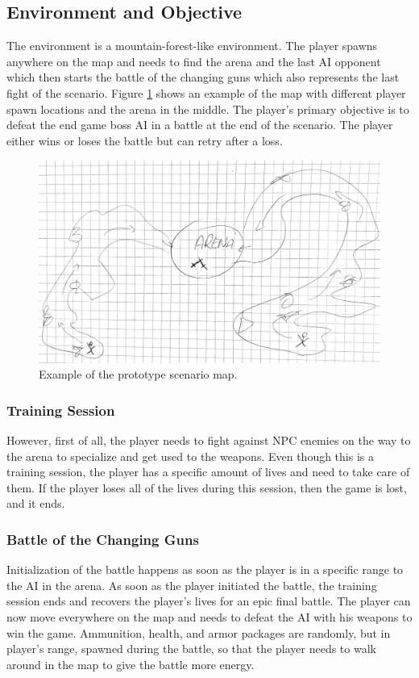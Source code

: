 \documentclass[MGS,Master,english]{twbook}%
\begin{document}
\subsection{Environment and Objective}
The environment is a mountain-forest-like environment. The player spawns anywhere on the map and needs to find the arena and the last AI opponent which then starts the battle of the changing guns which also represents the last fight of the scenario. Figure \ref{prototype::exampleMap} shows an example of the map with different player spawn locations and the arena in the middle. The player's primary objective is to defeat the end game boss AI in a battle at the end of the scenario. The player either wins or loses the battle but can retry after a loss.
\begin{figure}[!htbp]
	\centering
	\includegraphics[width=0.8\linewidth]{PICs/Prototype/map_example}
	\caption{Example of the prototype scenario map.}\label{prototype::exampleMap}
\end{figure}

\subsubsection{Training Session}
However, first of all, the player needs to fight against NPC enemies on the way to the arena to specialize and get used to the weapons. Even though this is a training session, the player has a specific amount of lives and need to take care of them. If the player loses all of the lives during this session, then the game is lost, and it ends.

\subsubsection{Battle of the Changing Guns}
Initialization of the battle happens as soon as the player is in a specific range to the AI in the arena. As soon as the player initiated the battle, the training session ends and recovers the player's lives for an epic final battle. The player can now move everywhere on the map and needs to defeat the AI with his weapons to win the game. Ammunition, health, and armor packages are randomly, but in player's range, spawned during the battle, so that the player needs to walk around in the map to give the battle more energy.
\end{document}
